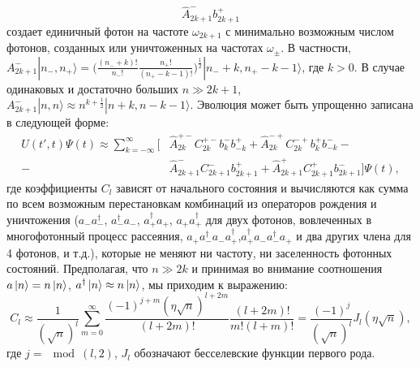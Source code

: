 \begin{equation}
	\hat{A}^-_{2k+1} b^+_{2k+1} 
	\label{Ap}
\end{equation}
создает единичный фотон на частоте $\omega_{2k+1}$ с минимально возможным числом фотонов, созданных или уничтоженных на частотах $\omega_\pm$.  
В частности, $A^-_{2k+1} |n_-,n_+\rangle = \big(\frac{(n_- + k)!}{n_-!} \frac{n_+!}{(n_+ - k-1)!} \big)^{\frac{1}{2}} |n_- + k, n_+ - k-1\rangle$, где $k>0$. В случае одинаковых и достаточно больших $n\gg 2k+1$, $A^-_{2k+1}|n,n\rangle \approx n^{k+\frac{1}{2}} |n + k, n - k-1\rangle$. 
Эволюция может быть упрощенно записана в следующей форме: 
\begin{equation}
	\begin{split}
	U(t',t)\Psi(t) \approx \sum_{k=-\infty}^{\infty} \big[&\hat{A}_{2k}^{+-} C^{+-}_{2k} b^-_{k} b^+_{-k} + \hat{A}_{2k}^{-+} C^{-+}_{2k} b^+_{k} b^-_{-k} -\\- &\hat{A}_{2k+1}^{-} C^{-}_{2k+1} b^+_{2k+1} + \hat{A}_{2k+1}^{+} C^{+}_{2k+1} b^-_{2k+1}\big] \Psi(t),
	\end{split}
	\label{uc}
\end{equation}
где коэффициенты $C_l$ зависят от начального состояния и вычисляются как сумма по всем возможным перестановкам комбинаций из операторов рождения и уничтожения ($a^{~}_{-} a^\dag_{-}$, $a^\dag_{-} a^{~}_{-}$, $a^\dag_{+} a^{~}_+$, $a^{~}_{+} a^\dag_{+}$ для двух фотонов, вовлеченных в многофотонный процесс рассеяния, $a^{~}_+ a^{\dag}_- a^{~}_- a^{\dag}_+$,$ a_+^\dag a^{~}_- a_-^\dag a^{~}_+$ и два других члена для 4 фотонов, и т.д.), которые не меняют ни частоту,  ни заселенность фотонных состояний. Предполагая, что $n \gg 2k$ и принимая во внимание соотношения $a\ket{n}=n \ket{n}$, $a^\dag\ket{n}\approx n \ket{n}$, мы приходим к выражению: 
\begin{equation}
	C_{l} \approx \frac{1}{(\sqrt{n})^l} \sum_{m=0}^\infty \frac{(-1)^{j+m}(\eta  \sqrt{n})^{l+2m}}{(l+2m)!} \frac{(l+2m)!}{m! (l+m)!} = \frac{(-1)^j}{(\sqrt{n})^l} J_l (\eta\sqrt{n}), 
\end{equation}
где $j = \mod(l,2)$, $J_l$ обозначают бесселевские функции первого рода. 

